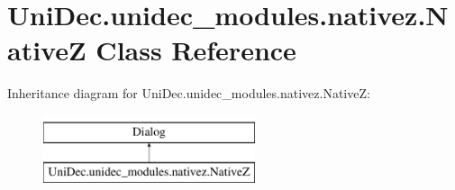 \hypertarget{class_uni_dec_1_1unidec__modules_1_1nativez_1_1_native_z}{}\section{Uni\+Dec.\+unidec\+\_\+modules.\+nativez.\+Native\+Z Class Reference}
\label{class_uni_dec_1_1unidec__modules_1_1nativez_1_1_native_z}
Inheritance diagram for Uni\+Dec.\+unidec\+\_\+modules.\+nativez.\+Native\+Z\+:\begin{figure}[H]
\begin{center}
\leavevmode
\includegraphics[height=2.000000cm]{class_uni_dec_1_1unidec__modules_1_1nativez_1_1_native_z}
\end{center}
\end{figure}
